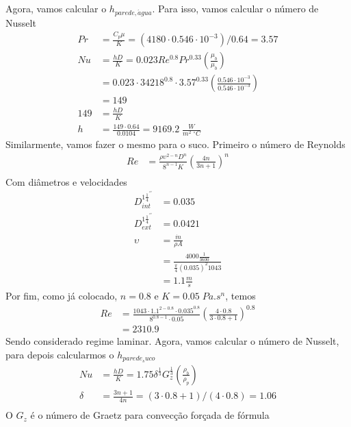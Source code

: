 Agora, vamos calcular o \(h_{parede,\acute{a}gua}\). Para isso, vamos calcular o número de Nusselt
\begin{align}
    Pr &= \frac{C_p \mu}{K} = (4180 \cdot 0.546 \cdot 10^{-3})/0.64 = 3.57\\
    Nu &= \frac{hD}{K} = 0.023 Re^{0.8} Pr^{0.33} \left( \frac{\mu_b}{\mu _{b} } \right)  \\
    &= 0.023 \cdot 34218^{0.8} \cdot 3.57^{0.33} \left( \frac{0.546 \cdot 10^{-3}}{0.546 \cdot 10^{-3}} \right)  \\
    &= 149\\
    149 &= \frac{hD}{K} \\
    h &= \frac{149 \cdot 0.64}{0.0104} = 9169.2 \; \frac{W}{m^{2} \; ^{\circ}C}
\end{align}
Similarmente, vamos fazer o mesmo para o suco. Primeiro o número de Reynolds
\begin{align}
    Re &= \frac{\rho \upsilon ^{2-n} D^{n} }{8^{n-1} K} \left( \frac{4n}{3n + 1} \right)^{n} \\
\end{align}
Com diâmetros e velocidades
\begin{align}
    D_{int}^{1 \frac{1}{4}^{\prime \prime}} &= 0.035 \;\\
    D_{ext}^{1 \frac{1}{4}^{\prime \prime}} &= 0.0421 \;\\
    \upsilon &= \frac{\dot{m}}{\rho A} \\
    &= \frac{4000 \frac{1}{3600}}{\frac{\pi}{4}\left( 0.035 \right)^{2} 1043 }\\
    &= 1.1 \frac{m}{s}
\end{align}
Por fim, como já colocado, \(n = 0.8\) e \(K = 0.05 \; Pa.s^{n}\), temos
\begin{align}
    Re &= \frac{1043 \cdot 1.1^{2-0.8} \cdot 0.035^{0.8} }{8^{0.8-1} \cdot 0.05} \left( \frac{4 \cdot 0.8}{3 \cdot 0.8 + 1} \right)^{0.8} \\
    &= 2310.9
\end{align}
Sendo considerado regime laminar. Agora, vamos calcular o número de Nusselt, para depois calcularmos
o \(h_{parede_suco}\)
\begin{align}
    Nu &= \frac{hD}{K} = 1.75 \delta ^{\frac{1}{3}} G_{z}^{\frac{1}{3}} \left( \frac{\rho _{b} }{\rho _{p} } \right) \\
    \delta &= \frac{3n+1}{4n} = (3 \cdot 0.8 + 1)/(4 \cdot 0.8) = 1.06 \\
\end{align}
O \(G_{z} \) é o número de Graetz para convecção forçada de fórmula
